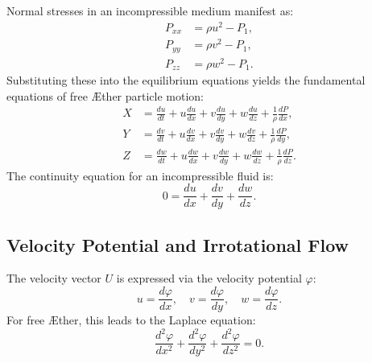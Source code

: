 \documentclass[a4paper,10pt]{article}
\begin{document}
    Normal stresses in an incompressible medium manifest as:
    \begin{align}
        P_{xx} &= \rho u^2 - P_1, \\
        P_{yy} &= \rho v^2 - P_1, \\
        P_{zz} &= \rho w^2 - P_1.
    \end{align}
    Substituting these into the equilibrium equations yields the fundamental equations of free Æther particle motion:
    \begin{align}
        X &= \frac{du}{dt} + u \frac{du}{dx} + v \frac{du}{dy} + w \frac{du}{dz} + \frac{1}{\rho} \frac{dP}{dx}, \\
        Y &= \frac{dv}{dt} + u \frac{dv}{dx} + v \frac{dv}{dy} + w \frac{dv}{dz} + \frac{1}{\rho} \frac{dP}{dy}, \\
        Z &= \frac{dw}{dt} + u \frac{dw}{dx} + v \frac{dw}{dy} + w \frac{dw}{dz} + \frac{1}{\rho} \frac{dP}{dz}.
    \end{align}
    The continuity equation for an incompressible fluid is:
    \begin{equation*}
        0 = \frac{du}{dx} + \frac{dv}{dy} + \frac{dw}{dz}.
    \end{equation*}

    \subsection*{Velocity Potential and Irrotational Flow}
    The velocity vector $U$ is expressed via the velocity potential $\varphi$:
    \begin{equation*}
        u = \frac{d \varphi}{dx}, \quad v = \frac{d \varphi}{dy}, \quad w = \frac{d \varphi}{dz}.
    \end{equation*}
    For free Æther, this leads to the Laplace equation:
    \begin{equation*}
        \frac{d^2 \varphi}{dx^2} + \frac{d^2 \varphi}{dy^2} + \frac{d^2 \varphi}{dz^2} = 0.
    \end{equation*}
\end{document}
